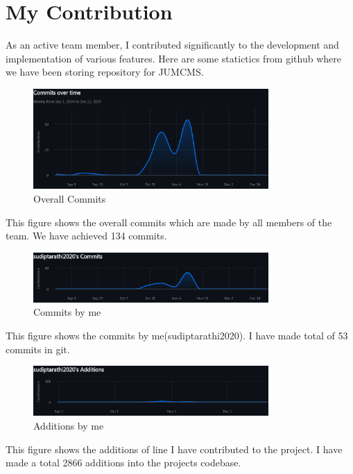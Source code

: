 \documentclass[a4paper,12pt]{article}
\begin{document}
\section{My Contribution}
As an active team member, I contributed significantly to the development and implementation of various
features. Here are some statictics from github where we have been storing repository for JUMCMS.
\begin{figure}[H]
    \centering
    \includegraphics[width=0.8\textwidth]{images/Commits over time.png}
    \caption{Overall Commits}
    \label{fig:overallcommits}
\end{figure}
This figure shows the overall commits which are made by all members of the team. We have achieved 134 commits.
\begin{figure}[H]
    \centering
    \includegraphics[width=0.8\textwidth]{images/sudiptarathi2020's Commits.png}
    \caption{Commits by me}
    \label{fig:mycommits}
\end{figure}
This figure shows the commits by me(sudiptarathi2020). I have made total of 53 commits in git. 
\begin{figure}[H]
    \centering
    \includegraphics[width=0.8\textwidth]{images/sudiptarathi2020's Additions.png}
    \caption{Additions by me}
    \label{fig:myadditions}
\end{figure}
This figure shows the additions of line I have contributed to the project. I have made a total 2866 additions
into the projects codebase.
\newpage
\end{document}
